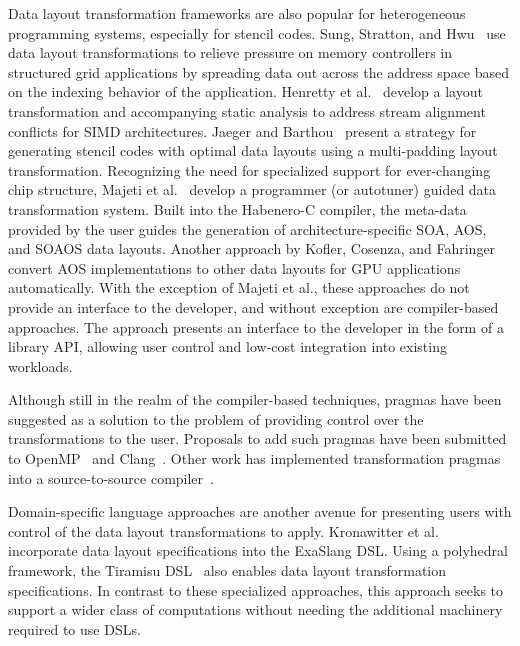 Data layout transformation frameworks are also popular for heterogeneous programming systems, especially for stencil codes.
Sung, Stratton, and Hwu~\cite{sung2010data} use data layout transformations to relieve pressure on memory controllers in structured grid applications by spreading data out across the address space based on the indexing behavior of the application.
Henretty et al.~\cite{henretty2011data} develop a layout transformation and accompanying static analysis to address stream alignment conflicts for SIMD architectures.
Jaeger and Barthou~\cite{jaeger2012automatic} present a strategy for generating stencil codes with optimal data layouts using a multi-padding layout transformation.
Recognizing the need for specialized support for ever-changing chip structure, Majeti et al.~\cite{majeti2013compiler} develop a programmer (or autotuner) guided data transformation system.
Built into the Habenero-C compiler, the meta-data provided by the user guides the generation of architecture-specific SOA, AOS, and SOAOS data layouts.
Another approach by Kofler, Cosenza, and Fahringer~\cite{kofler2015automatic} convert AOS implementations to other data layouts for GPU applications automatically.  
With the exception of Majeti et al., these approaches do not provide an interface to the developer, and without exception are compiler-based approaches.
The \FormatDecisions{} approach presents an interface to the developer in the form of a library API, allowing user control and low-cost integration into existing workloads.

Although still in the realm of the compiler-based techniques, pragmas have been suggested as a solution to the problem of providing control over the transformations to the user.
Proposals to add such pragmas have been submitted to OpenMP~\cite{kruse2019design} and Clang~\cite{kruse2018user}.
Other work has implemented transformation pragmas into a source-to-source compiler~\cite{xu2014semi}. 


Domain-specific language approaches are another avenue for presenting users with control of the data layout transformations to apply. 
Kronawitter et al.~\cite{kronawitter2018automatic} incorporate data layout specifications into the ExaSlang DSL.
Using a polyhedral framework, the Tiramisu DSL~\cite{baghdadi2019tiramisu} also enables data layout transformation specifications.
In contrast to these specialized approaches, this approach seeks to support a wider class of computations without needing the additional machinery required to use DSLs. 


